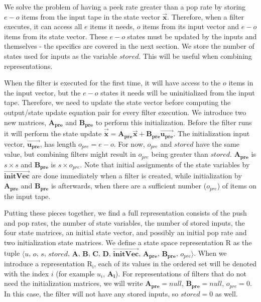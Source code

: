    We solve the problem of having a peek rate greater than a pop
rate by storing $e-o$ items from the input tape in the state
vector $\vec{\mathbf{x}}$. Therefore, when a filter executes, it
can access all $e$ items it needs, $o$ items from its input vector
and $e-o$ items from its state vector. These $e-o$ states must be
updated by the inputs and themselves - the specifics are covered
in the next section. We store the number of states used for inputs
as the variable $stored$. This will be useful when combining
representations.

    When the filter is executed for the first time, it will have access
to the $o$ items in the input vector, but the $e-o$ states it
needs will be uninitialized from the input tape. Therefore, we
need to update the state vector before computing the output/state
update equation pair for every filter execution. We introduce two
new matrices, $\mathbf{A_{pre}}$ and $\mathbf{B_{pre}}$ to perform
this initialization. Before the filter runs it will perform the
state update $\vec{\dot{\mathbf{x}}} =
\mathbf{A_{pre}}\vec{\mathbf{x}} +
\mathbf{B_{pre}}\vec{\mathbf{u_{pre}}}$. The initialization input
vector, $\vec{\mathbf{u_{pre}}}$, has length $o_{pre} = e-o$. For
now, $o_{pre}$ and $stored$ have the same value, but combining
filters might result in $o_{pre}$ being greater than $stored$.
$\mathbf{A_{pre}}$ is $s \times s$ and $\mathbf{B_{pre}}$ is $s
\times o_{pre}$. Note that initial assignments of the state
variables by $\overrightarrow{\mathbf{initVec}}$ are done
immediately when a filter is created, while initialization by
$\mathbf{A_{pre}}$ and $\mathbf{B_{pre}}$ is afterwards, when
there are a sufficient number ($o_{pre}$) of items on the input
tape.

    Putting these pieces together, we find a full representation
consists of the push and pop rates, the number of state variables,
the number of stored inputs, the four state matrices, an initial
state vector, and possibly an initial pop rate and two
initialization state matrices. We define a state space
representation $\mathrm{R}$ as the tuple $\langle$$u$, $o$, $s$,
$stored$, $\mathbf{A}$, $\mathbf{B}$, $\mathbf{C}$, $\mathbf{D}$,
$\overrightarrow{\mathbf{initVec}}$, $\mathbf{A_{pre}}$,
$\mathbf{B_{pre}}$, $o_{pre}$$\rangle$. When we introduce a
representation $\mathrm{R_i}$, each of its values in the ordered
set will be denoted with the index $i$ (for example $u_i$,
$\mathbf{A_i}$). For representations of filters that do not need
the initialization matrices, we will write $\mathbf{A_{pre}} =
null$, $\mathbf{B_{pre}} = null$, $o_{pre} = 0$. In this case, the
filter will not have any stored inputs, so $stored = 0$ as well.

